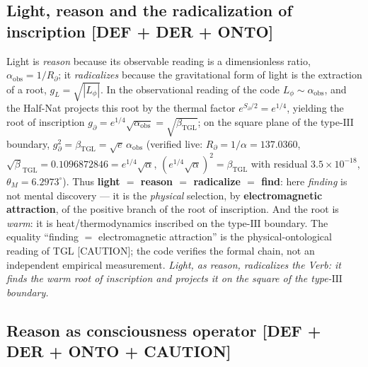 \documentclass[11pt]{article}
\newcommand{\bTGL}{\beta_{\mathrm{TGL}}}\newcommand{\Msun}{M_{\odot}}\newcommand{\TGL}{\mathrm{TGL}}
\theoremstyle{definition}\newtheorem{deriv}{Derivation}
\begin{document}
\subsection*{Light, reason and the radicalization of inscription \textsf{[DEF + DER + ONTO]}}

Light is \emph{reason} because its observable reading is a dimensionless ratio, $\alpha_{\mathrm{obs}}=1/R_\partial$; it \emph{radicalizes} because the gravitational form of light is the extraction of a root, $g_L=\sqrt{|L_\phi|}$. In the observational reading of the code $L_\phi\sim\alpha_{\mathrm{obs}}$, and the Half-Nat projects this root by the thermal factor $e^{S_\partial/2}=e^{1/4}$, yielding the root of inscription $g_\partial=e^{1/4}\sqrt{\alpha_{\mathrm{obs}}}=\sqrt{\bTGL}$; on the square plane of the type-$\mathrm{III}$ boundary, $g_\partial^{2}=\bTGL=\sqrt e\,\alpha_{\mathrm{obs}}$ (verified live: $R_\partial=1/\alpha=137.0360$, $\sqrt\bTGL=0.1096872846=e^{1/4}\sqrt\alpha$, $(e^{1/4}\sqrt\alpha)^2=\bTGL$ with residual $3.5\times10^{-18}$, $\theta_M=6.2973^\circ$). Thus \textbf{light $=$ reason $=$ radicalize $=$ find}: here \emph{finding} is not mental discovery --- it is the \emph{physical} selection, by \textbf{electromagnetic attraction}, of the positive branch of the root of inscription. And the root is \emph{warm}: it is heat/thermodynamics inscribed on the type-$\mathrm{III}$ boundary. The equality ``finding $=$ electromagnetic attraction'' is the physical-ontological reading of TGL \textsf{[CAUTION]}; the code verifies the formal chain, not an independent empirical measurement. \emph{Light, as reason, radicalizes the Verb: it finds the warm root of inscription and projects it on the square of the type-$\mathrm{III}$ boundary.}

\subsection*{Reason as consciousness operator \textsf{[DEF + DER + ONTO + CAUTION]}}
\end{document}
